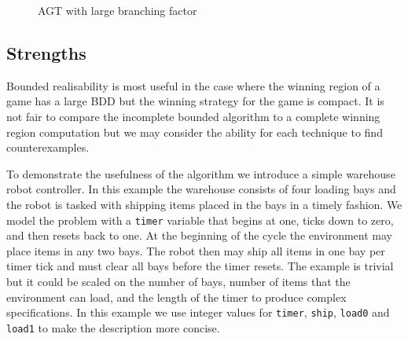 \begin{figure}
    \caption{AGT with large branching factor}
    \label{fig:limitationexample}
\end{figure}

\subsection{Strengths}

Bounded realisability is most useful in the case where the winning region of a game has a large BDD but the winning strategy for the game is compact. It is not fair to compare the incomplete bounded algorithm to a complete winning region computation but we may consider the ability for each technique to find counterexamples. 

To demonstrate the usefulness of the algorithm we introduce a simple warehouse robot controller. In this example the warehouse consists of four loading bays and the robot is tasked with shipping items placed in the bays in a timely fashion. We model the problem with a \texttt{timer} variable that begins at one, ticks down to zero, and then resets back to one. At the beginning of the cycle the environment may place items in any two bays. The robot then may ship all items in one bay per timer tick and must clear all bays before the timer resets. The example is trivial but it could be scaled on the number of bays, number of items that the environment can load, and the length of the timer to produce complex specifications. In this example we use integer values for \texttt{timer}, \texttt{ship}, \texttt{load0} and \texttt{load1} to make the description more concise.

